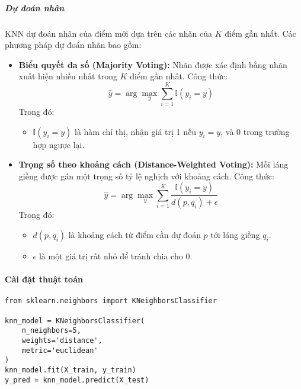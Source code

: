 \documentclass[a4paper,12pt]{article}
\begin{document}
\subparagraph{Dự đoán nhãn}  
\hspace{5mm}KNN dự đoán nhãn của điểm mới dựa trên các nhãn của \(K\) điểm gần nhất. Các phương pháp dự đoán nhãn bao gồm:
\begin{itemize}
    \item \textbf{Biểu quyết đa số (Majority Voting):} Nhãn được xác định bằng nhãn xuất hiện nhiều nhất trong \(K\) điểm gần nhất. Công thức:
    \[
    \hat{y} = \arg \max_y \sum_{i=1}^K \mathbb{I}(y_i = y)
    \]
    Trong đó:
    \begin{itemize}
        \item \(\mathbb{I}(y_i = y)\) là hàm chỉ thị, nhận giá trị 1 nếu \(y_i = y\), và 0 trong trường hợp ngược lại.
    \end{itemize}

    \item \textbf{Trọng số theo khoảng cách (Distance-Weighted Voting):} Mỗi láng giềng được gán một trọng số tỷ lệ nghịch với khoảng cách. Công thức:
    \[
    \hat{y} = \arg \max_y \sum_{i=1}^K \frac{\mathbb{I}(y_i = y)}{d(p, q_i) + \epsilon}
    \]
    Trong đó:
    \begin{itemize}
        \item \(d(p, q_i)\) là khoảng cách từ điểm cần dự đoán \(p\) tới láng giềng \(q_i\).
        \item \(\epsilon\) là một giá trị rất nhỏ để tránh chia cho 0.
    \end{itemize}
\end{itemize}

\paragraph{Cài đặt thuật toán}

\begin{verbatim}
from sklearn.neighbors import KNeighborsClassifier

knn_model = KNeighborsClassifier(
    n_neighbors=5, 
    weights='distance', 
    metric='euclidean'
)
knn_model.fit(X_train, y_train)
y_pred = knn_model.predict(X_test)
\end{verbatim}
\end{document}
